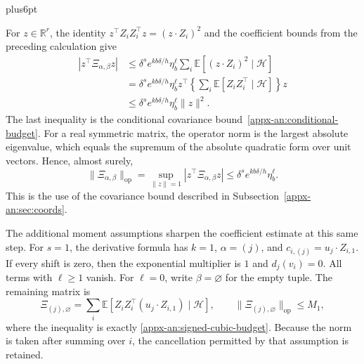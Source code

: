 \documentclass[11pt,letterpaper,twoside,leqno]{article}
\makeatletter
\theoremstyle{bookplain}
\theoremstyle{bookremark}
\renewenvironment{proof}[1][\proofname]{\par
  \pushQED{\qed}\normalfont\topsep6pt plus6pt\relax
  \trivlist\item[\hskip\labelsep\bfseries #1\@addpunct{.}]\ignorespaces
}{\popQED\endtrivlist\@endpefalse}
\newcommand{\E}{\mathbb E}
\newcommand{\R}{\mathbb R}
\newcommand{\op}{\mathrm{op}}
\makeatother
\begin{document}
\begin{proof}
For $z\in\R^r$, the identity
$z^\top Z_iZ_i^\top z=(z\cdot Z_i)^2$ and the coefficient bounds
from the preceding calculation give
\[
 \begin{aligned}
 |z^\top\Xi_{\alpha,\beta}z|
 &\le\delta^s e^{kb\delta/h}\eta_b^\ell
       \sum_i\E[(z\cdot Z_i)^2\mid\mathcal H]\\
 &=\delta^s e^{kb\delta/h}\eta_b^\ell
       z^\top\left\{\sum_i\E[Z_iZ_i^\top\mid\mathcal H]\right\}z\\
 &\le\delta^s e^{kb\delta/h}\eta_b^\ell\|z\|^2.
 \end{aligned}
\]
The last inequality is the conditional covariance
bound~\eqref{appx-an:conditional-budget}. For a real symmetric
matrix, the operator norm is the largest absolute eigenvalue,
which equals the supremum of the absolute quadratic form over
unit vectors. Hence, almost surely,
\[
 \|\Xi_{\alpha,\beta}\|_{\op}
 =\sup_{\|z\|=1}|z^\top\Xi_{\alpha,\beta}z|
 \le\delta^s e^{kb\delta/h}\eta_b^\ell.
\]
This is the use of the covariance bound described in
Subsection~\ref{appx-an:sec:coords}.

The additional moment assumptions sharpen the coefficient
estimate at this same step. For $s=1$, the derivative formula
has $k=1$, $\alpha=(j)$, and
$c_{i,(j)}=u_j\cdot Z_{i,1}$. If every shift is zero, then the
exponential multiplier is $1$ and $d_j(v_i)=0$. All terms with
$\ell\ge1$ vanish. For $\ell=0$, write $\beta=\varnothing$ for
the empty tuple. The remaining matrix is
\[
 \Xi_{(j),\varnothing}
 =\sum_i\E[Z_iZ_i^\top(u_j\cdot Z_{i,1})\mid\mathcal H],
 \qquad
 \|\Xi_{(j),\varnothing}\|_{\op}\le M_1,
\]
where the inequality is exactly
\eqref{appx-an:signed-cubic-budget}. Because the norm is taken
after summing over $i$, the cancellation permitted by that
assumption is retained.


\end{proof}
\end{document}
